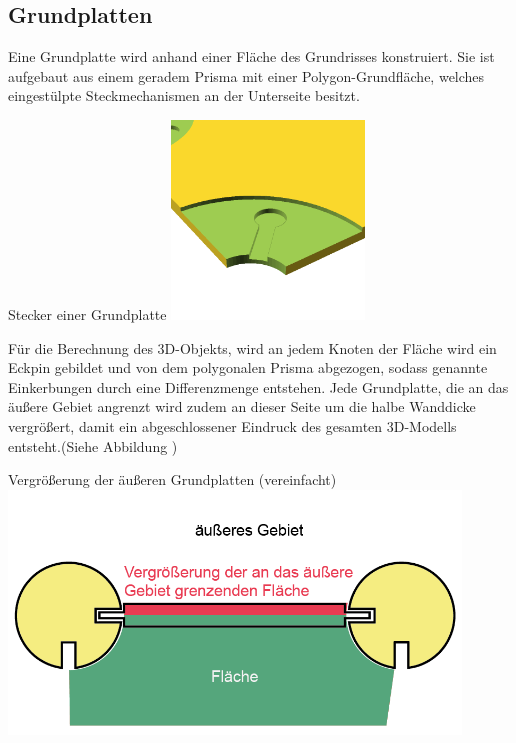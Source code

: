 \subsection{Grundplatten}
Eine Grundplatte wird anhand einer Fläche des Grundrisses konstruiert.
Sie ist aufgebaut aus einem geradem Prisma mit einer Polygon-Grundfläche, welches eingestülpte Steckmechanismen an der Unterseite besitzt.
\begin{Bild}{Stecker einer Grundplatte}
	\includegraphics[height=200px]{Bilder/Untereinheit_GP}
\end{Bild}
Für die Berechnung des 3D-Objekts, wird an jedem Knoten der Fläche wird ein Eckpin gebildet und von dem polygonalen Prisma abgezogen, sodass genannte Einkerbungen durch eine Differenzmenge entstehen. 
Jede Grundplatte, die an das äußere Gebiet angrenzt wird zudem an dieser Seite um die halbe Wanddicke vergrößert, damit ein abgeschlossener Eindruck des gesamten 3D-Modells entsteht.(Siehe Abbildung \thebildnrnext)
\begin{Bild}{Vergrößerung der äußeren Grundplatten (vereinfacht)}
	\includegraphics[width=120mm]{Bilder/GrundplatteVergroesserung-08}
\end{Bild}

